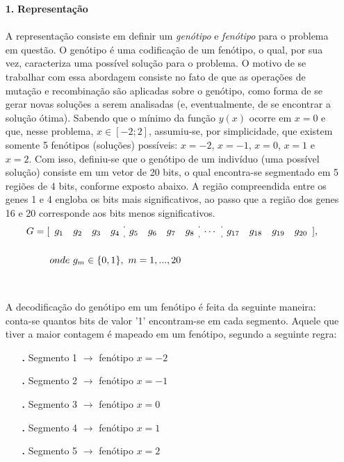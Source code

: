\documentclass{report}
\begin{document}
	\begin{itemize}
	
		\item[\textbf{1.}] \textbf{Representação}
		
		\paragraph{} A representação consiste em definir um \emph{genótipo} e \emph{fenótipo} para o problema em questão. O genótipo é uma codificação de um fenótipo, o qual, por sua vez, caracteriza uma possível solução para o problema. O motivo de se trabalhar com essa abordagem consiste no fato de que as operações de mutação e recombinação são aplicadas sobre o genótipo, como forma de se gerar novas soluções a serem analisadas (e, eventualmente, de se encontrar a solução ótima). Sabendo que o mínimo da função $y(x)$ ocorre em $x = 0$ e que, nesse problema, $x \in [-2;2]$, assumiu-se, por simplicidade, que existem somente 5 fenótipos (soluções) possíveis: $x = -2$, $x = -1$, $x = 0$, $x = 1$ e $x = 2$. Com isso, definiu-se que o genótipo de um indivíduo (uma possível solução) consiste em um vetor de 20 bits, o qual encontra-se segmentado em 5 regiões de 4 bits, conforme exposto abaixo. A região compreendida entre os genes 1 e 4 engloba os bits mais significativos, ao passo que a região dos genes 16 e 20 corresponde aos bits menos significativos.\\ 
		
		\begin{align*}
			G = [&
			\begin{array}{cccc:cccc:c:cccc}
			g_1 & g_2 & g_3 & g_4 & g_5 & g_6 & g_7 & g_8 & \cdots & 	g_{17} & g_{18} & g_{19} & g_{20}
			\end{array}
			],\\\\ 
			& onde \  g_m \in \{0, 1 \},\ m = 1, ..., 20
		\end{align*}	\\
	
		\paragraph{} A decodificação do genótipo em um fenótipo é feita da seguinte maneira: conta-se quantos bits de valor '1' encontram-se em cada segmento. Aquele que tiver a maior contagem é mapeado em um fenótipo, segundo a seguinte regra:\\
		
		\begin{itemize}
			\item[\textbf{.}] Segmento 1 $\rightarrow$ fenótipo $x = -2$
			\item[\textbf{.}] Segmento 2 $\rightarrow$ fenótipo $x = -1$
			\item[\textbf{.}] Segmento 3 $\rightarrow$ fenótipo $x = 0$
			\item[\textbf{.}] Segmento 4 $\rightarrow$ fenótipo $x = 1$
			\item[\textbf{.}] Segmento 5 $\rightarrow$ fenótipo $x = 2$
		\end{itemize}		 
	

\end{itemize}
\end{document}
